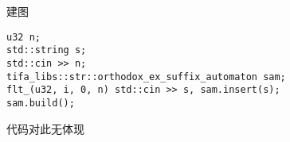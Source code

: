 建图

\begin{verbatim}
u32 n;
std::string s;
std::cin >> n;
tifa_libs::str::orthodox_ex_suffix_automaton sam;
flt_(u32, i, 0, n) std::cin >> s, sam.insert(s);
sam.build();
\end{verbatim}


代码对此无体现\\
\\